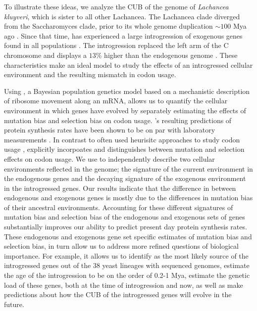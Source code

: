 \documentclass[fleqn,letterpaper]{article}
\begin{document}
To illustrate these ideas, we analyze the CUB of the genome of \emph{Lachancea kluyveri}, which is sister to all other Lachancea.
The Lachancea clade diverged from the Saccharomyces clade, prior to its whole genome duplication $\sim 100$ Mya ago \citep{MHM2015,Beimforde2014}.
Since that time, \kluyveri has experienced a large introgression of exogenous genes found in all populations \citep{friedrich2015}.
The introgression replaced the left arm of the C chromosome and displays a $13 \%$ higher \GC than the endogenous \kluyveri genome \citep{payen2009, friedrich2015}.
These characteristics make \kluyveri an ideal model to study the effects of an introgressed cellular environment and the resulting mismatch in codon usage.

Using \ROC, a Bayesian population genetics model based on a mechanistic description of ribosome movement along an mRNA, allows us to quantify the cellular environment in which genes have evolved by separately estimating the effects of mutation bias and selection bias on codon usage.
\ROC's resulting predictions of protein synthesis rates have been shown to be on par with laboratory measurements \citep{ShahAndGilchrist2011, gilchrist2015}.
In contrast to often used heurisitc approaches to study codon usage \citep{sharp1987, dosreis2004}, \ROC explicitly incorpoates and distinguishes between mutation and selection effects on codon usage.
We use \ROC to independently describe two cellular environments reflected in the \kluyveri genome; the signature of the current environment in the endogenous genes and the decaying signature of the exogenous environment in the introgressed genes.
Our results indicate that the difference in \GC between endogenous and exogenous genes is mostly due to the differences in mutation bias of their ancestral environments.
Accounting for these different signatures of mutation bias and selection bias of the endogenous and exogenous sets of genes substantially improves our ability to predict present day protein synthesis rates.
These endogenous and exogenous gene set specific estimates of mutation bias and selection bias, in turn allow us to address more refined questions of biological importance.
For example, it allows us to identify \gossypii as the most likely source of the introgressed genes out of the 38 yeast lineages with sequenced genomes, estimate the age of the introgression to be on the order of 0.2-1 Mya, estimate the genetic load of these genes, both at the time of introgression and now, as well as make predictions about how the CUB of the introgressed genes will evolve in the future.
\end{document}

